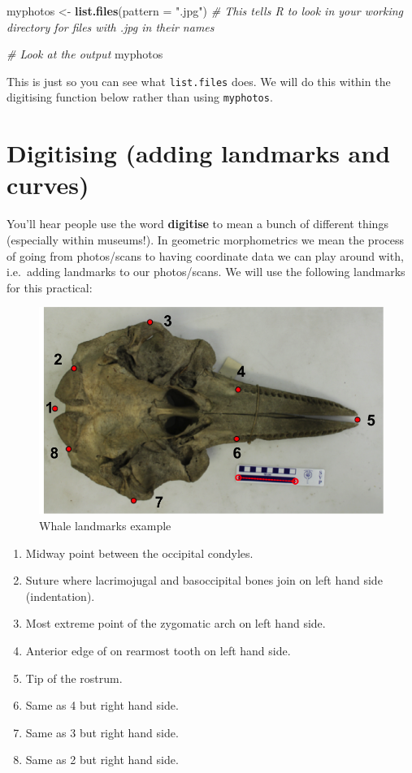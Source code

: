 \documentclass[]{book}
\newenvironment{Shaded}{\begin{snugshade}}{\end{snugshade}}
\newcommand{\KeywordTok}[1]{\textcolor[rgb]{0.13,0.29,0.53}{\textbf{{#1}}}}
\newcommand{\DataTypeTok}[1]{\textcolor[rgb]{0.13,0.29,0.53}{{#1}}}
\newcommand{\StringTok}[1]{\textcolor[rgb]{0.31,0.60,0.02}{{#1}}}
\newcommand{\CommentTok}[1]{\textcolor[rgb]{0.56,0.35,0.01}{\textit{{#1}}}}
\newcommand{\NormalTok}[1]{{#1}}
\providecommand{\tightlist}{%
  \setlength{\itemsep}{0pt}\setlength{\parskip}{0pt}}
\begin{document}
\begin{Shaded}
\begin{Highlighting}[]
\NormalTok{myphotos <-}\StringTok{ }\KeywordTok{list.files}\NormalTok{(}\DataTypeTok{pattern =} \StringTok{".jpg"}\NormalTok{)}
\CommentTok{# This tells R to look in your working directory for files with .jpg in their names}

\CommentTok{# Look at the output}
\NormalTok{myphotos}
\end{Highlighting}
\end{Shaded}

This is just so you can see what \texttt{list.files} does. We will do
this within the digitising function below rather than using
\texttt{myphotos}.

\section{Digitising (adding landmarks and
curves)}\label{digitising-adding-landmarks-and-curves}

You'll hear people use the word \textbf{digitise} to mean a bunch of
different things (especially within museums!). In geometric
morphometrics we mean the process of going from photos/scans to having
coordinate data we can play around with, i.e.~adding landmarks to our
photos/scans. We will use the following landmarks for this practical:

\begin{figure}
\centering
\includegraphics{whale.png}
\caption{Whale landmarks example}
\end{figure}

\begin{enumerate}
\def\labelenumi{\arabic{enumi}.}
\tightlist
\item
  Midway point between the occipital condyles.
\item
  Suture where lacrimojugal and basoccipital bones join on left hand
  side (indentation).
\item
  Most extreme point of the zygomatic arch on left hand side.
\item
  Anterior edge of on rearmost tooth on left hand side.
\item
  Tip of the rostrum.
\item
  Same as 4 but right hand side.
\item
  Same as 3 but right hand side.
\item
  Same as 2 but right hand side.
\end{enumerate}
\end{document}
